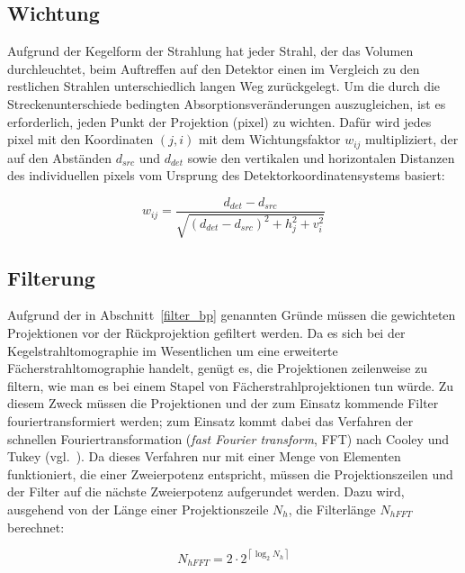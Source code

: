 \subsection{Wichtung}\label{sssec:fdk_wichtung}

Aufgrund der Kegelform der Strahlung hat jeder Strahl, der das Volumen durchleuchtet, beim Auftreffen auf den Detektor
einen im Vergleich zu den restlichen Strahlen unterschiedlich langen Weg zurückgelegt. Um die durch die
Streckenunterschiede bedingten Absorptionsveränderungen auszugleichen, ist es erforderlich, jeden Punkt der Projektion
(\gls{pixel}) zu wichten.
Dafür wird jedes \gls{pixel} mit den Koordinaten $(j, i)$ mit dem Wichtungsfaktor $w_{ij}$ multipliziert, der auf den
Abständen $d_{src}$ und $d_{det}$ sowie den vertikalen und horizontalen Distanzen des individuellen \gls{pixel}s vom
Ursprung des Detektorkoordinatensystems basiert:

\begin{equation}\label{eq:wichtung}
    w_{ij} = \frac{d_{det} - d_{src}}{\sqrt{(d_{det} - d_{src})^2 + h_j^2 + v_i^2}}
\end{equation}

\subsection{Filterung}\label{sssec:fdk_filter}

Aufgrund der in Abschnitt~\ref{filter_bp} genannten Gründe müssen die gewichteten Projektionen vor der Rückprojektion
gefiltert werden. Da es sich bei der Kegelstrahltomographie im Wesentlichen um eine erweiterte Fächerstrahltomographie
handelt, genügt es, die Projektionen zeilenweise zu filtern, wie man es bei einem {\glqq}Stapel{\grqq} von
Fächerstrahlprojektionen tun würde. Zu diesem Zweck müssen die Projektionen und der zum Einsatz kommende Filter
fouriertransformiert werden; zum Einsatz kommt dabei das Verfahren der schnellen Fouriertransformation (\textit{fast
Fourier transform}, FFT) nach Cooley und Tukey (vgl.~\cite{cooltuk}). Da dieses Verfahren nur mit einer Menge von
Elementen funktioniert, die einer Zweierpotenz entspricht, müssen die Projektionszeilen und der Filter auf die nächste
Zweierpotenz {\glqq}aufgerundet{\grqq} werden. Dazu wird, ausgehend von der Länge einer Projektionszeile $N_h$, die
Filterlänge $N_{hFFT}$ berechnet:

\begin{equation}
    N_{hFFT} = 2 \cdot 2^{\left\lceil \log_{2} N_h \right\rceil}
\end{equation}

